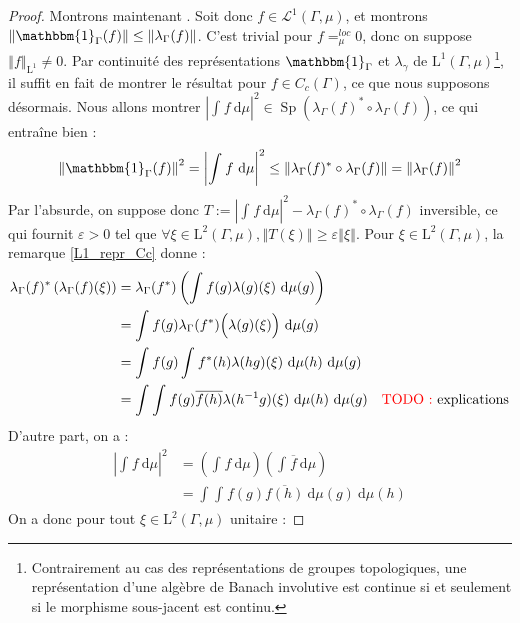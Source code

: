 \documentclass[a4paper,12pt]{article}
\newcommand{\norm}[1]{\left\Vert #1\right\Vert}
\newcommand{\abs}[1]{\left\vert#1\right\vert}
\newcommand{\indic}{\mathbbm{1}}
\newcommand{\integral}[4]{\int_{#1}^{#2} #3~\mathrm{d}#4}
\newcommand{\ssi}{si et seulement si }
\newcommand{\inv}{^{-1}}
\newcommand{\comp}{\circ}
\renewcommand{\implies}{\Rightarrow}
\newcommand{\TODO}[1]{{\color{red}TODO :} #1}
\DeclareMathOperator{\Sp}{Sp}
\begin{document}
\begin{proof}
    Montrons maintenant \framebox{$(\ref{amenable_weak_contain/strong_almost_invariant})\implies(\ref{amenable_weak_contain/weak_contain})$}. Soit donc $f\in\mathscr{L}^1(\Gamma, \mu)$,
    et montrons $\norm{\indic_\Gamma(f)}\le\norm{\lambda_\Gamma(f)}$. C'est trivial pour $f=_\mu^{loc} 0$, donc on suppose $\norm{f}_{\mathrm{L}^1}\ne0$. Par continuité des représentations $\indic_\Gamma$ et 
    $\lambda_\gamma$ de $\mathrm{L}^1(\Gamma, \mu)$\footnote{Contrairement au cas des représentations de groupes topologiques, 
    une représentation d'une algèbre de Banach involutive est continue \ssi le morphisme sous-jacent est continu.}, il suffit en fait de montrer le résultat pour $f\in C_c(\Gamma)$, ce que nous supposons désormais.
    Nous allons montrer $\abs{\integral{}{}{f}{\mu}}^2\in\Sp\left(\lambda_\Gamma(f)^*\comp \lambda_\Gamma(f)\right)$, ce qui entraîne bien :
    \begin{equation*}
        \norm{\indic_\Gamma(f)}^2=\abs{\integral{}{}{f}{\mu}}^2\le\norm{\lambda_\Gamma(f)^*\comp \lambda_\Gamma(f)} = \norm{\lambda_\Gamma(f)}^2
    \end{equation*}
    Par l'absurde, on suppose donc $T := \abs{\integral{}{}{f}{\mu}}^2 - \lambda_\Gamma(f)^*\comp \lambda_\Gamma(f)$ inversible, ce qui fournit $\varepsilon>0$
    tel que $\forall\xi\in\mathrm{L}^2(\Gamma, \mu), \norm{T(\xi)}\ge\varepsilon\norm{\xi}$.
    Pour $\xi\in\mathrm{L}^2(\Gamma, \mu)$, la remarque \ref{L1_repr_Cc} donne :
    \begin{align*}
        \lambda_\Gamma(f)^*\left(\lambda_\Gamma(f)(\xi)\right) 
            &= \lambda_\Gamma(f^*)\left(\integral{}{}{f(g)\lambda(g)(\xi)}{\mu(g)}\right) \\
            &= \integral{}{}{f(g)\lambda_\Gamma(f^*)\Big(\lambda(g)(\xi)\Big)}{\mu(g)} \\
            &= \integral{}{}{f(g)\integral{}{}{f^*(h)\lambda(hg)(\xi)}{\mu(h)}}{\mu(g)} \\
            &= \integral{}{}{\integral{}{}{f(g)\overline{f(h)}\lambda(h\inv g)(\xi)}{\mu(h)}}{\mu(g)}\quad\text{\TODO{explications}}
    \end{align*} 
    D'autre part, on a :
    \begin{align*}
        \abs{\integral{}{}{f}{\mu}}^2 
            &= \left(\integral{}{}{f}{\mu}\right)\left(\integral{}{}{\overline{f}}{\mu}\right) \\
            &= \integral{}{}{\integral{}{}{f(g)\overline{f(h)}}{\mu(g)}}{\mu(h)}
    \end{align*}
    On a donc pour tout $\xi\in\mathrm{L}^2(\Gamma, \mu)$ unitaire :

\end{proof}
\end{document}
